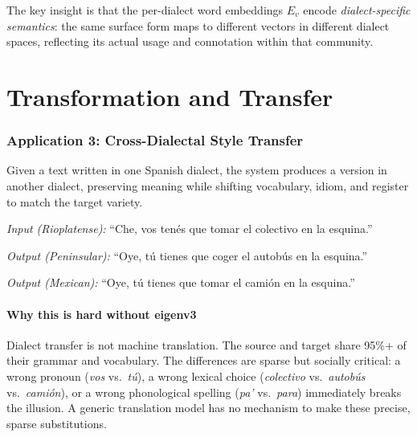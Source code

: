\documentclass[11pt,a4paper]{article}
\begin{document}
The key insight is that the per-dialect word embeddings $E_v$ encode
\emph{dialect-specific semantics}: the same surface form maps to
different vectors in different dialect spaces, reflecting its actual
usage and connotation within that community.

\part{Transformation and Transfer}

\section{Application 3: Cross-Dialectal Style Transfer}
\label{sec:app-transfer}

\begin{appbox}
Given a text written in one Spanish dialect, the system produces a
version in another dialect, preserving meaning while shifting
vocabulary, idiom, and register to match the target variety.

\medskip
\emph{Input (Rioplatense):} ``Che, vos ten\'es que tomar el colectivo
en la esquina.''

\emph{Output (Peninsular):} ``Oye, t\'u tienes que coger el
autob\'us en la esquina.''

\emph{Output (Mexican):} ``Oye, t\'u tienes que tomar el cami\'on en
la esquina.''
\end{appbox}

\subsection{Why this is hard without eigenv3}

Dialect transfer is not machine translation. The source and target
share 95\%+ of their grammar and vocabulary. The differences are
sparse but socially critical: a wrong pronoun (\emph{vos} vs.\
\emph{t\'u}), a wrong lexical choice (\emph{colectivo} vs.\
\emph{autob\'us} vs.\ \emph{cami\'on}), or a wrong phonological
spelling (\emph{pa'} vs.\ \emph{para}) immediately breaks the
illusion. A generic translation model has no mechanism to make these
precise, sparse substitutions.
\end{document}
